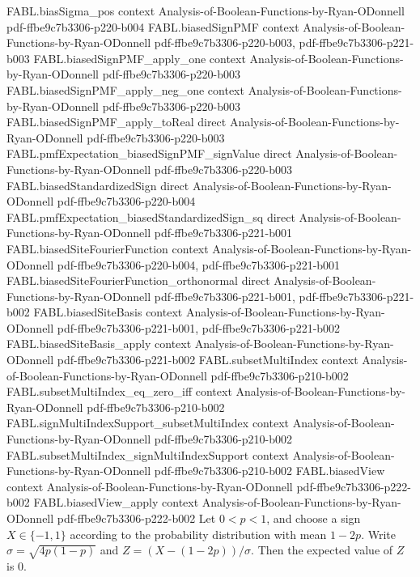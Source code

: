 \begin{theorem}
\proofstep
  {FABL.biasSigma_pos}
  {context}
  {Analysis-of-Boolean-Functions-by-Ryan-ODonnell}
  {pdf-ffbe9c7b3306-p220-b004}
\proofstep
  {FABL.biasedSignPMF}
  {context}
  {Analysis-of-Boolean-Functions-by-Ryan-ODonnell}
  {pdf-ffbe9c7b3306-p220-b003,
    pdf-ffbe9c7b3306-p221-b003}
\proofstep
  {FABL.biasedSignPMF_apply_one}
  {context}
  {Analysis-of-Boolean-Functions-by-Ryan-ODonnell}
  {pdf-ffbe9c7b3306-p220-b003}
\proofstep
  {FABL.biasedSignPMF_apply_neg_one}
  {context}
  {Analysis-of-Boolean-Functions-by-Ryan-ODonnell}
  {pdf-ffbe9c7b3306-p220-b003}
\proofstep
  {FABL.biasedSignPMF_apply_toReal}
  {direct}
  {Analysis-of-Boolean-Functions-by-Ryan-ODonnell}
  {pdf-ffbe9c7b3306-p220-b003}
\proofstep
  {FABL.pmfExpectation_biasedSignPMF_signValue}
  {direct}
  {Analysis-of-Boolean-Functions-by-Ryan-ODonnell}
  {pdf-ffbe9c7b3306-p220-b003}
\proofstep
  {FABL.biasedStandardizedSign}
  {direct}
  {Analysis-of-Boolean-Functions-by-Ryan-ODonnell}
  {pdf-ffbe9c7b3306-p220-b004}
\proofstep
  {FABL.pmfExpectation_biasedStandardizedSign_sq}
  {direct}
  {Analysis-of-Boolean-Functions-by-Ryan-ODonnell}
  {pdf-ffbe9c7b3306-p221-b001}
\proofstep
  {FABL.biasedSiteFourierFunction}
  {context}
  {Analysis-of-Boolean-Functions-by-Ryan-ODonnell}
  {pdf-ffbe9c7b3306-p220-b004,
    pdf-ffbe9c7b3306-p221-b001}
\proofstep
  {FABL.biasedSiteFourierFunction_orthonormal}
  {direct}
  {Analysis-of-Boolean-Functions-by-Ryan-ODonnell}
  {pdf-ffbe9c7b3306-p221-b001,
    pdf-ffbe9c7b3306-p221-b002}
\proofstep
  {FABL.biasedSiteBasis}
  {context}
  {Analysis-of-Boolean-Functions-by-Ryan-ODonnell}
  {pdf-ffbe9c7b3306-p221-b001,
    pdf-ffbe9c7b3306-p221-b002}
\proofstep
  {FABL.biasedSiteBasis_apply}
  {context}
  {Analysis-of-Boolean-Functions-by-Ryan-ODonnell}
  {pdf-ffbe9c7b3306-p221-b002}
\proofstep
  {FABL.subsetMultiIndex}
  {context}
  {Analysis-of-Boolean-Functions-by-Ryan-ODonnell}
  {pdf-ffbe9c7b3306-p210-b002}
\proofstep
  {FABL.subsetMultiIndex_eq_zero_iff}
  {context}
  {Analysis-of-Boolean-Functions-by-Ryan-ODonnell}
  {pdf-ffbe9c7b3306-p210-b002}
\proofstep
  {FABL.signMultiIndexSupport_subsetMultiIndex}
  {context}
  {Analysis-of-Boolean-Functions-by-Ryan-ODonnell}
  {pdf-ffbe9c7b3306-p210-b002}
\proofstep
  {FABL.subsetMultiIndex_signMultiIndexSupport}
  {context}
  {Analysis-of-Boolean-Functions-by-Ryan-ODonnell}
  {pdf-ffbe9c7b3306-p210-b002}
\proofstep
  {FABL.biasedView}
  {context}
  {Analysis-of-Boolean-Functions-by-Ryan-ODonnell}
  {pdf-ffbe9c7b3306-p222-b002}
\proofstep
  {FABL.biasedView_apply}
  {context}
  {Analysis-of-Boolean-Functions-by-Ryan-ODonnell}
  {pdf-ffbe9c7b3306-p222-b002}
Let $0<p<1$, and choose a sign $X\in\{-1,1\}$ according to the probability distribution
with mean $1-2p$. Write $\sigma=\sqrt{4p(1-p)}$ and $Z=(X-(1-2p))/\sigma$. Then the
expected value of $Z$ is $0$.
\end{theorem}

